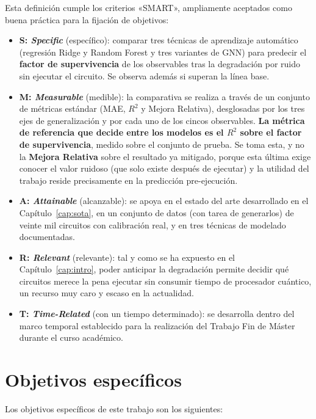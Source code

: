 Esta definición cumple los criterios «SMART», ampliamente aceptados como buena práctica para la fijación de objetivos:

\begin{itemize}
    \item \textbf{S: \textit{Specific}} (específico): comparar tres técnicas de aprendizaje automático (regresión Ridge y Random Forest y tres variantes de GNN) para predecir el \textbf{factor de supervivencia} de los observables tras la degradación por ruido sin ejecutar el circuito. Se observa además si superan la línea base.
      \item \textbf{M: \textit{Measurable}} (medible): la comparativa se realiza a través de un conjunto de métricas estándar (MAE, $R^2$ y Mejora Relativa), desglosadas por los tres ejes de generalización y por cada uno de los cincos observables. \textbf{La métrica de referencia que decide entre los modelos es el $R^2$ sobre el factor de supervivencia}, medido sobre el conjunto de prueba. Se toma esta, y no la \textbf{Mejora Relativa} sobre el resultado ya mitigado, porque esta última exige conocer el valor ruidoso (que solo existe después de ejecutar) y la utilidad del trabajo reside precisamente en la predicción pre-ejecución.
    \item \textbf{A: \textit{Attainable}} (alcanzable): se apoya en el estado del arte
          desarrollado en el Capítulo~\ref{cap:sota}, en un conjunto de datos (con tarea de generarlos) de
          veinte mil circuitos con calibración real, y en tres técnicas de modelado documentadas.
    \item \textbf{R: \textit{Relevant}} (relevante): tal y como se ha expuesto en el
          Capítulo~\ref{cap:intro}, poder anticipar la degradación permite decidir qué
          circuitos merece la pena ejecutar sin consumir tiempo de procesador cuántico, un recurso muy caro y escaso en la actualidad.
    \item \textbf{T: \textit{Time-Related}} (con un tiempo determinado): se desarrolla dentro del marco temporal establecido para la realización del Trabajo Fin de Máster durante el curso académico.
\end{itemize}

\section{Objetivos específicos}
\label{sec:objetivos_especificos}

Los objetivos específicos de este trabajo son los siguientes:

